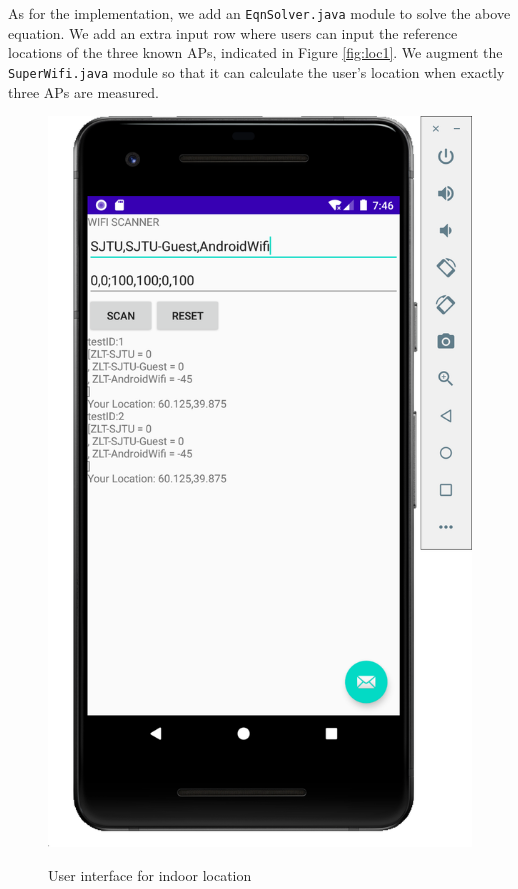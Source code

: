 As for the implementation, we add an \texttt{EqnSolver.java} module to solve the above equation. We add an extra input row where users can input the reference locations of the three known APs, indicated in Figure \ref{fig:loc1}. We augment the \texttt{SuperWifi.java} module so that it can calculate the user's location when exactly three APs are measured.


\begin{figure}[t]
  \centering
  \begin{minipage}[t]{0.48\linewidth}
    \centering
    \label{fig:loc1}
    \includegraphics[width=0.8\columnwidth]{img/test3.png} 
    \caption{User interface for indoor location}
  \end{minipage}
  \begin{minipage}[t]{0.48\linewidth}
  \centering
  \label{fig:real1}

\end{minipage}
\end{figure}
